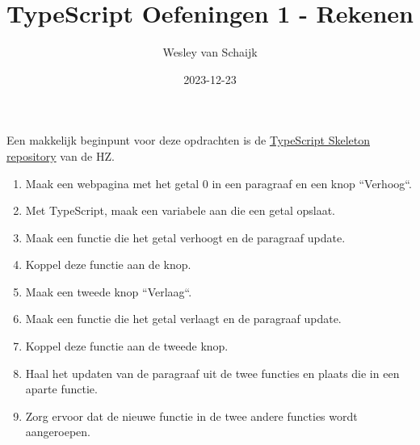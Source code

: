 \documentclass{article}
\title{TypeScript Oefeningen 1 - Rekenen}
\author{Wesley van Schaijk}
\date{2023-12-23}
\begin{document}
\maketitle

\paragraph{}
Een makkelijk beginpunt voor deze opdrachten is de \href{https://github.com/HZ-HBO-ICT/ts-skeleton-app}{TypeScript Skeleton repository} van de HZ.

\begin{enumerate}
	\item Maak een webpagina met het getal 0 in een paragraaf en een knop ``Verhoog``.
	\item Met TypeScript, maak een variabele aan die een getal opslaat.
	\item Maak een functie die het getal verhoogt en de paragraaf update.
	\item Koppel deze functie aan de knop.
	\item Maak een tweede knop ``Verlaag``.
	\item Maak een functie die het getal verlaagt en de paragraaf update.
	\item Koppel deze functie aan de tweede knop.
	\item Haal het updaten van de paragraaf uit de twee functies en plaats die in een aparte functie.
	\item Zorg ervoor dat de nieuwe functie in de twee andere functies wordt aangeroepen.
\end{enumerate}
\end{document}
